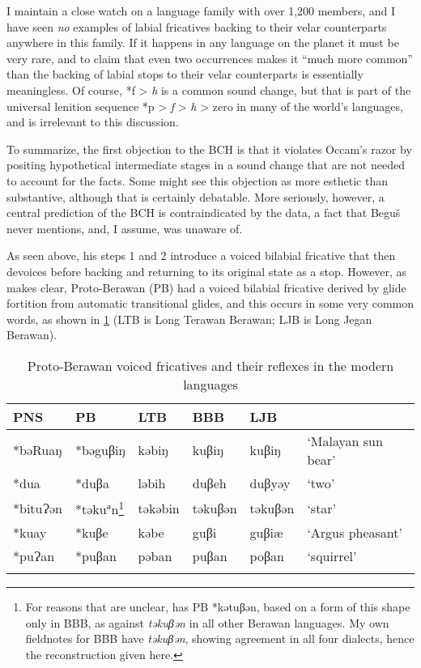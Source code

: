 \documentclass[output=paper]{langscibook}
\begin{document}
I maintain a close watch on a language family with over 1,200 members, and I have seen \textit{no} examples of labial fricatives backing to their velar counterparts anywhere in this family. If it happens in any language on the planet it must be very rare, and to claim that even two occurrences makes it “much more common” than the backing of labial stops to their velar counterparts is essentially meaningless. Of course, *f > \textit{h} is a common sound change, but that is part of the universal lenition sequence *p > \textit{f} > \textit{h} > zero in many of the world’s languages, and is irrelevant to this discussion.

To summarize, the first objection to the BCH is that it violates Occam’s razor by positing hypothetical intermediate stages in a sound change that are not needed to account for the facts.  Some might see this objection as more esthetic than substantive, although that is certainly debatable. More seriously, however, a central prediction of the BCH is contraindicated by the data, a fact that Beguš never mentions, and, I assume, was unaware of.  

As seen above, his steps 1 and 2 introduce a voiced bilabial fricative that then devoices before backing and returning to its original state as a stop. However, as \citet[166]{Burkhardt2014} makes clear, Proto-Berawan (PB) had a voiced bilabial fricative derived by glide fortition from automatic transitional glides, and this occurs in some very common words, as shown in \cref{tab:PB-Voiced-Fric} (LTB is Long Terawan Berawan; LJB is Long Jegan Berawan). 

\begin{table}[t]
\caption{\label{tab:PB-Voiced-Fric}Proto-Berawan voiced fricatives and their reflexes in the modern languages}
\begin{tabular}{llllll}
\lsptoprule
PNS  &  PB &   LTB  &  BBB &   LJB\\
\midrule
*bəRuaŋ  & *bəguβiŋ& kəbiŋ  &  kuβiŋ &   kuβiŋ   & `Malayan sun bear'  \\
*dua     & *duβa   &ləbih   & duβeh  &  duβyəy   & `two'               \\
*bituɁən  & *təku$^ə$n\footnote{For reasons that are unclear, \citet[166]{Burkhardt2014} has PB *kǝtuβǝn, based on a form of this shape only in BBB, as against \textit{təkuβən} in all other Berawan languages.  My own fieldnotes for BBB have \textit{təkuβən}, showing agreement in all four dialects, hence the reconstruction given here.} & təkəbin &   təkuβən & təkuβən & `star'\\
*kuay    & *kuβe   & kəbe  &  guβi  &  guβiæ  &  `Argus pheasant'\\
*puɁan    & *puβan & pəban &  puβan &  poβan  &  `squirrel'\\
\lspbottomrule
\end{tabular}
\end{table}
\end{document}
